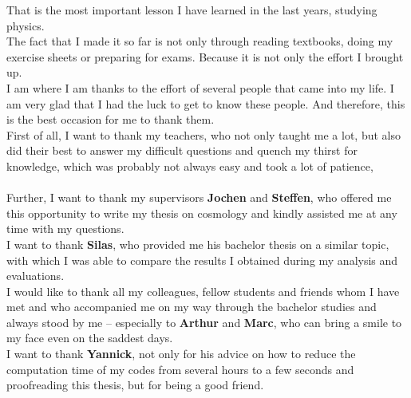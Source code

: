 \noindent That is the most important lesson I have learned in the last years, studying physics. \\ 

\noindent The fact that I made it so far is not only through reading textbooks, doing my exercise sheets or preparing for exams. Because it is not only the effort I brought up. \\
I am where I am thanks to the effort of several people that came into my life. I am very glad that I had the luck to get to know these people. And therefore, this is the best occasion for me to thank them. \\

\noindent First of all, I want to thank my teachers, who not only taught me a lot, but also did their best to answer my difficult questions and quench my thirst for knowledge, which was probably not always easy and took a lot of patience, \\

 \\

\noindent Further, I want to thank my supervisors \textbf{Jochen} and \textbf{Steffen}, who offered me this opportunity to write my thesis on cosmology and kindly assisted me at any time with my questions. \\

\noindent I want to thank \textbf{Silas}, who provided me his bachelor thesis on a similar topic, with which I was able to compare the results I obtained during my analysis and evaluations. \\

\noindent I would like to thank all my colleagues, fellow students and friends whom I have met and who accompanied me on my way through the bachelor studies and always stood by me -- especially to \textbf{Arthur} and \textbf{Marc}, who can bring a smile to my face even on the saddest days. \\

\noindent I want to thank \textbf{Yannick}, not only for his advice on how to reduce the computation time of my codes from several hours to a few seconds and proofreading this thesis, but for being a good friend. \\

